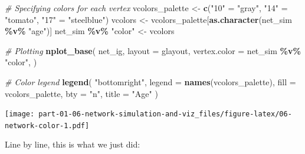 \documentclass[
]{book}
\newenvironment{Shaded}{\begin{snugshade}}{\end{snugshade}}
\newcommand{\AttributeTok}[1]{\textcolor[rgb]{0.13,0.29,0.53}{#1}}
\newcommand{\CommentTok}[1]{\textcolor[rgb]{0.56,0.35,0.01}{\textit{#1}}}
\newcommand{\FunctionTok}[1]{\textcolor[rgb]{0.13,0.29,0.53}{\textbf{#1}}}
\newcommand{\NormalTok}[1]{#1}
\newcommand{\OtherTok}[1]{\textcolor[rgb]{0.56,0.35,0.01}{#1}}
\newcommand{\SpecialCharTok}[1]{\textcolor[rgb]{0.81,0.36,0.00}{\textbf{#1}}}
\newcommand{\StringTok}[1]{\textcolor[rgb]{0.31,0.60,0.02}{#1}}
\begin{document}
\begin{Shaded}
\begin{Highlighting}[]
\CommentTok{\# Specifying colors for each vertex}
\NormalTok{vcolors\_palette }\OtherTok{\textless{}{-}} \FunctionTok{c}\NormalTok{(}\StringTok{"10"} \OtherTok{=} \StringTok{"gray"}\NormalTok{, }\StringTok{"14"} \OtherTok{=} \StringTok{"tomato"}\NormalTok{, }\StringTok{"17"} \OtherTok{=} \StringTok{"steelblue"}\NormalTok{)}
\NormalTok{vcolors }\OtherTok{\textless{}{-}}\NormalTok{ vcolors\_palette[}\FunctionTok{as.character}\NormalTok{(net\_sim }\SpecialCharTok{\%v\%} \StringTok{"age"}\NormalTok{)]}
\NormalTok{net\_sim }\SpecialCharTok{\%v\%} \StringTok{"color"} \OtherTok{\textless{}{-}}\NormalTok{ vcolors}

\CommentTok{\# Plotting}
\FunctionTok{nplot\_base}\NormalTok{(}
\NormalTok{  net\_ig,}
  \AttributeTok{layout =}\NormalTok{ glayout,}
  \AttributeTok{vertex.color =}\NormalTok{ net\_sim }\SpecialCharTok{\%v\%} \StringTok{"color"}\NormalTok{,}
\NormalTok{  )}

\CommentTok{\# Color legend}
\FunctionTok{legend}\NormalTok{(}
  \StringTok{"bottomright"}\NormalTok{,}
  \AttributeTok{legend =} \FunctionTok{names}\NormalTok{(vcolors\_palette),}
  \AttributeTok{fill   =}\NormalTok{ vcolors\_palette, }
  \AttributeTok{bty    =} \StringTok{"n"}\NormalTok{,}
  \AttributeTok{title  =} \StringTok{"Age"}
\NormalTok{  )}
\end{Highlighting}
\end{Shaded}

\texttt{[image: part-01-06-network-simulation-and-viz\_files/figure-latex/06-network-color-1.pdf]}

Line by line, this is what we just did:
\end{document}
